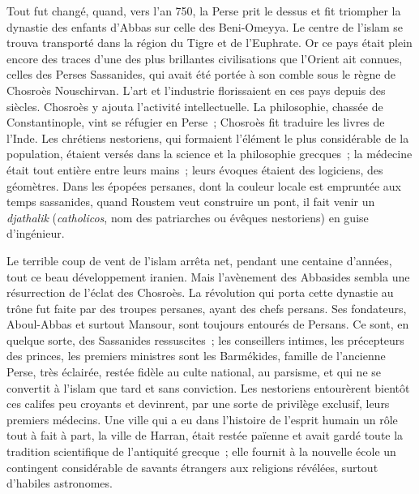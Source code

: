 \documentclass[french,twoside]{book} %
\newcommand\orgName[1]{#1}
\newcommand\persName[1]{#1}
\newcommand\placeName[1]{#1}
\begin{document}
Tout fut changé, quand, vers l’an 750, la {\orgName Perse} prit le dessus et fit triompher la dynastie des {\orgName enfants d’Abbas} sur celle des {\orgName Beni-Omeyya}. Le centre de l’islam se trouva transporté dans la région du {\placeName Tigre} et de l’{\placeName Euphrate}. Or ce pays était plein encore des traces d’une des plus brillantes civilisations que l’{\placeName Orient} ait connues, celles des {\orgName Perses Sassanides}, qui avait été portée à son comble sous le règne de {\persName Chosroès Nouschirvan}. L’art et l’industrie florissaient en ces pays depuis des siècles. {\persName Chosroès} y ajouta l’activité intellectuelle. La philosophie, chassée de {\placeName Constantinople}, vint se réfugier en {\placeName Perse} ; {\persName Chosroès} fit traduire les livres de l’{\placeName Inde}. Les {\orgName chrétiens nestoriens}, qui formaient l’élément le plus considérable de la population, étaient versés dans la science et la philosophie grecques ; la médecine était tout entière entre leurs mains ; leurs évoques étaient des logiciens, des géomètres. Dans les épopées persanes, dont la couleur locale est empruntée aux temps sassanides, quand {\persName Roustem} veut construire un pont, il fait venir un {\itshape djathalik} ({\itshape catholicos}, nom des patriarches ou évêques nestoriens) en guise d’ingénieur.\par
Le terrible coup de vent de l’islam arrêta net, pendant une centaine d’années, tout ce beau développement iranien. Mais l’avènement des {\orgName Abbasides} sembla une résurrection de l’éclat des {\orgName Chosroès}. La révolution qui porta cette dynastie au trône fut faite par des troupes persanes, ayant des chefs persans. Ses fondateurs, {\persName Aboul-Abbas} et surtout {\persName Mansour}, sont toujours entourés de Persans. Ce sont, en quelque sorte, des Sassanides ressuscites ; les conseillers intimes, les précepteurs des princes, les premiers ministres sont les Barmékides, famille de l’ancienne Perse, très éclairée, restée fidèle au culte national, au parsisme, et qui ne se convertit à l’islam que tard et sans conviction. Les nestoriens entourèrent bientôt ces califes peu croyants et devinrent, par une sorte de privilège exclusif, leurs premiers médecins. Une ville qui a eu dans l’histoire de l’esprit humain un rôle tout à fait à part, la ville de {\placeName Harran}, était restée païenne et avait gardé toute la tradition scientifique de l’antiquité grecque ; elle fournit à la nouvelle école un contingent considérable de savants étrangers aux religions révélées, surtout d’habiles astronomes.\par
\end{document}
